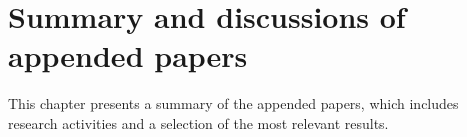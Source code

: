 \chapter{Summary and discussions of appended papers}\label{ch:results}
This chapter presents a summary of the appended papers, which includes research activities and a selection of the most relevant results.





%





